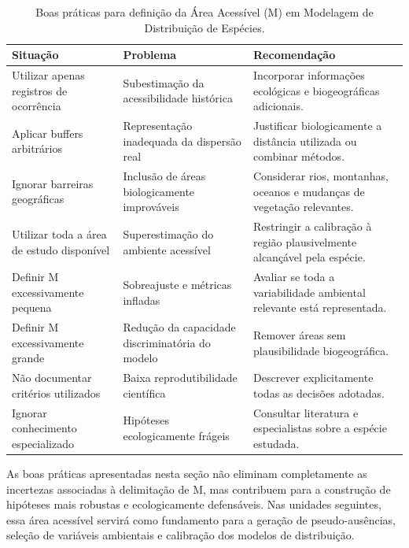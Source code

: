 \begin{table}[H]
	\centering
	\caption{Boas práticas para definição da Área Acessível (M) em Modelagem de Distribuição de Espécies.}
	\label{tab:boas_praticas_M}
	\begin{tabular}{p{4cm} p{5cm} p{6cm}}
		\toprule
		\textbf{Situação} &
		\textbf{Problema} &
		\textbf{Recomendação} \\
		\midrule
		
		Utilizar apenas registros de ocorrência &
		Subestimação da acessibilidade histórica &
		Incorporar informações ecológicas e biogeográficas adicionais. \\
		
		Aplicar buffers arbitrários &
		Representação inadequada da dispersão real &
		Justificar biologicamente a distância utilizada ou combinar métodos. \\
		
		Ignorar barreiras geográficas &
		Inclusão de áreas biologicamente improváveis &
		Considerar rios, montanhas, oceanos e mudanças de vegetação relevantes. \\
		
		Utilizar toda a área de estudo disponível &
		Superestimação do ambiente acessível &
		Restringir a calibração à região plausivelmente alcançável pela espécie. \\
		
		Definir M excessivamente pequena &
		Sobreajuste e métricas infladas &
		Avaliar se toda a variabilidade ambiental relevante está representada. \\
		
		Definir M excessivamente grande &
		Redução da capacidade discriminatória do modelo &
		Remover áreas sem plausibilidade biogeográfica. \\
		
		Não documentar critérios utilizados &
		Baixa reprodutibilidade científica &
		Descrever explicitamente todas as decisões adotadas. \\
		
		Ignorar conhecimento especializado &
		Hipóteses ecologicamente frágeis &
		Consultar literatura e especialistas sobre a espécie estudada. \\
		
		\bottomrule
	\end{tabular}
\end{table}

As boas práticas apresentadas nesta seção não eliminam completamente as incertezas associadas à delimitação de M, mas contribuem para a construção de hipóteses mais robustas e ecologicamente defensáveis. Nas unidades seguintes, essa área acessível servirá como fundamento para a geração de pseudo-ausências, seleção de variáveis ambientais e calibração dos modelos de distribuição.







